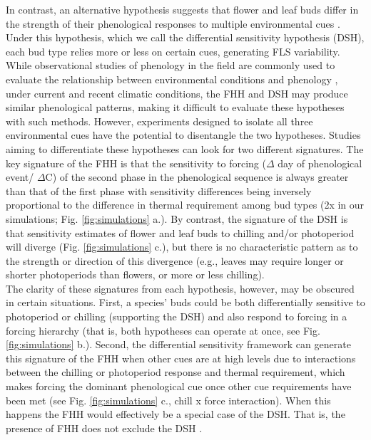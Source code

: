\documentclass[11pt]{article}\usepackage[]{graphicx}\usepackage[]{color}
\begin{document}
\noindent In contrast, an alternative hypothesis suggests that flower and leaf buds differ in the strength of their phenological responses to multiple environmental cues \citep{Citadin2001,Gariglio2006,Aslani2009,Mehlenbacher:1991aa}. Under this hypothesis, which we call the differential sensitivity hypothesis (DSH), each bud type relies more or less on certain cues, generating FLS variability.\\ %

\noindent While observational studies of phenology in the field are commonly used to evaluate the relationship between environmental conditions and phenology \citep{Cleland2007}, under current and recent climatic conditions, the FHH and DSH may produce similar phenological patterns, making it difficult to evaluate these hypotheses with such methods. However, experiments designed to isolate all three environmental cues have the potential to disentangle the two hypotheses. Studies aiming to differentiate these hypotheses can look for two different signatures. The key signature of the FHH is that the sensitivity to forcing ($\Delta$ day of phenological event/ $\Delta$\degree C) of the second phase in the phenological sequence is always greater than that of the first phase with sensitivity differences being inversely proportional to the difference in thermal requirement among bud types (2x in our simulations; Fig. \ref{fig:simulations} a.). By contrast, the signature of the DSH is that sensitivity estimates of flower and leaf buds to chilling and/or photoperiod will diverge (Fig. \ref{fig:simulations} c.), but there is no characteristic pattern as to the strength or direction of this divergence (e.g., leaves may require longer or shorter photoperiods than flowers, or more or less chilling).\\


\noindent The clarity of these signatures from each hypothesis, however, may be obscured in certain situations. First, a species' buds could be both differentially sensitive to photoperiod or chilling (supporting the DSH) and also respond to forcing in a forcing hierarchy (that is, both hypotheses can operate at once, see Fig. \ref{fig:simulations} b.). Second, the differential sensitivity framework can generate this signature of the FHH when other cues are at high levels due to interactions between the chilling or photoperiod response and thermal requirement, which makes forcing the dominant phenological cue once other cue requirements have been met (see Fig. \ref{fig:simulations} c., chill x force interaction). When this happens the FHH would effectively be a special case of the DSH. That is, the presence of FHH does not exclude the DSH \citep{Gariglio2006}.\\ 
\end{document}
